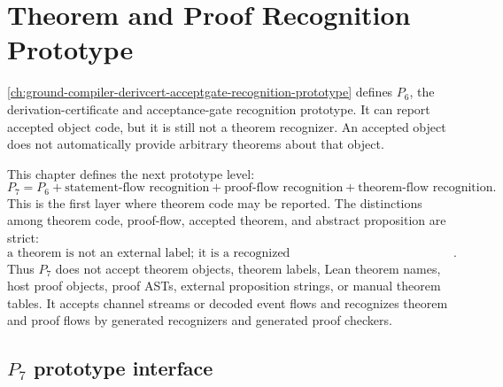 \chapter{Theorem and Proof Recognition Prototype}
\label{ch:ground-compiler-theorem-proof-recognition-prototype}

\autoref{ch:ground-compiler-derivcert-acceptgate-recognition-prototype} defines $P_6$, the derivation-certificate and acceptance-gate recognition prototype. It can report accepted object code, but it is still not a theorem recognizer. An accepted object does not automatically provide arbitrary theorems about that object.

This chapter defines the next prototype level:
$$
  \boxed{P_7=P_6+\text{statement-flow recognition}+\text{proof-flow recognition}+\text{theorem-flow recognition}.}
$$
This is the first layer where theorem code may be reported. The distinctions among theorem code, proof-flow, accepted theorem, and abstract proposition are strict:
$$
  \boxed{\text{a theorem is not an external label; it is a recognized statement/proof/dependency/certificate/ledger/status/site structure}.}
$$
Thus $P_7$ does not accept theorem objects, theorem labels, Lean theorem names, host proof objects, proof ASTs, external proposition strings, or manual theorem tables. It accepts channel streams or decoded event flows and recognizes theorem and proof flows by generated recognizers and generated proof checkers.

\section{$P_7$ prototype interface}
\label{sec:theorem-proof-p7-interface}

